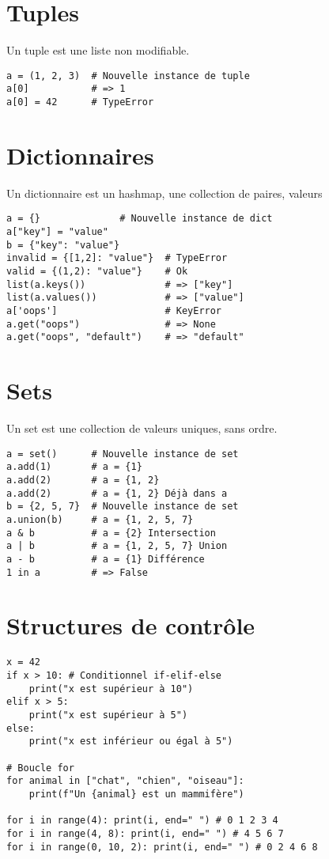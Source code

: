 \documentclass{article}
\begin{document}
\begin{multicols*}{4}
\section*{Tuples}
Un tuple est une liste non modifiable.
\begin{lstlisting}
a = (1, 2, 3)  # Nouvelle instance de tuple
a[0]           # => 1
a[0] = 42      # TypeError
\end{lstlisting}

\section*{Dictionnaires}
Un dictionnaire est un hashmap, une collection de paires, valeurs 
\begin{lstlisting}
a = {}              # Nouvelle instance de dict
a["key"] = "value"
b = {"key": "value"}        
invalid = {[1,2]: "value"}  # TypeError
valid = {(1,2): "value"}    # Ok
list(a.keys())              # => ["key"]
list(a.values())            # => ["value"]
a['oops']                   # KeyError
a.get("oops")               # => None
a.get("oops", "default")    # => "default"
\end{lstlisting}

\section*{Sets}
Un set est une collection de valeurs uniques, sans ordre.
\begin{lstlisting}
a = set()      # Nouvelle instance de set
a.add(1)       # a = {1}
a.add(2)       # a = {1, 2}
a.add(2)       # a = {1, 2} Déjà dans a
b = {2, 5, 7}  # Nouvelle instance de set
a.union(b)     # a = {1, 2, 5, 7}
a & b          # a = {2} Intersection
a | b          # a = {1, 2, 5, 7} Union
a - b          # a = {1} Différence
1 in a         # => False
\end{lstlisting}

\section*{Structures de contrôle}
\begin{lstlisting}
x = 42
if x > 10: # Conditionnel if-elif-else
    print("x est supérieur à 10")
elif x > 5:
    print("x est supérieur à 5")
else:
    print("x est inférieur ou égal à 5")

# Boucle for
for animal in ["chat", "chien", "oiseau"]:
    print(f"Un {animal} est un mammifère")

for i in range(4): print(i, end=" ") # 0 1 2 3 4
for i in range(4, 8): print(i, end=" ") # 4 5 6 7
for i in range(0, 10, 2): print(i, end=" ") # 0 2 4 6 8


\end{lstlisting}
\end{multicols*}
\end{document}
